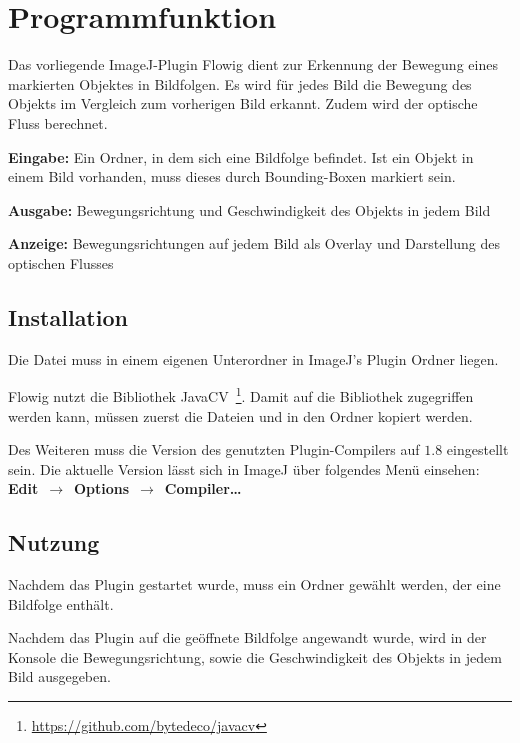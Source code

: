 
\chapter{Programmfunktion}\label{sec:Einleitung}
Das vorliegende ImageJ-Plugin Flowig dient zur Erkennung der Bewegung eines markierten Objektes in Bildfolgen. Es wird für jedes Bild die Bewegung des Objekts im Vergleich zum vorherigen Bild erkannt. Zudem wird der optische Fluss berechnet.

\textbf{Eingabe: } Ein Ordner, in dem sich eine Bildfolge befindet. Ist ein Objekt in einem Bild vorhanden, muss dieses durch Bounding-Boxen markiert sein.


\textbf{Ausgabe: } Bewegungsrichtung und Geschwindigkeit des Objekts in jedem Bild


\textbf{Anzeige: } Bewegungsrichtungen auf jedem Bild als Overlay und Darstellung des optischen Flusses

\section{Installation}
Die Datei  muss in einem eigenen Unterordner  in ImageJ's Plugin Ordner liegen.

Flowig nutzt die Bibliothek JavaCV~\footnote{\url{https://github.com/bytedeco/javacv}}. Damit auf die Bibliothek zugegriffen werden kann, müssen zuerst die Dateien  und  in den Ordner  kopiert werden.

Des Weiteren muss die Version des genutzten Plugin-Compilers auf $1.8$ eingestellt sein. 
Die aktuelle Version lässt sich in ImageJ über folgendes Menü einsehen:\\
\mbox{\textbf{Edit}~$\rightarrow$~\textbf{Options}~$\rightarrow$~\textbf{Compiler\dots}} 

\section{Nutzung}

Nachdem das Plugin gestartet wurde, muss ein Ordner gewählt werden, der eine Bildfolge enthält.

Nachdem das Plugin auf die geöffnete Bildfolge angewandt wurde, wird in der Konsole die Bewegungsrichtung, sowie die Geschwindigkeit des Objekts in jedem Bild ausgegeben.

